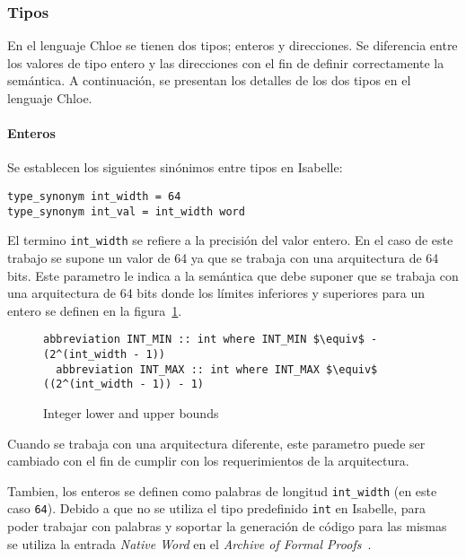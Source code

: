 \subsubsection*{Tipos}

En el lenguaje Chloe se tienen dos tipos; enteros y direcciones.
Se diferencia entre los valores de tipo entero y las direcciones con el fin de definir correctamente la semántica.
A continuación, se presentan los detalles de los dos tipos en el lenguaje Chloe.

\paragraph*{Enteros}

Se establecen los siguientes sinónimos entre tipos en Isabelle:

\begin{lstlisting}[frame=single]
type_synonym int_width = 64
type_synonym int_val = int_width word
\end{lstlisting}


El termino \verb|int_width| se refiere a la precisión del valor entero.
En el caso de este trabajo se supone un valor de 64 ya que se trabaja con una arquitectura de 64 bits.
Este parametro le indica a la semántica que debe suponer que se trabaja con una arquitectura de 64 bits donde los límites inferiores y superiores para un entero se definen en la figura~\ref{fig:int_bounds}.

\begin{figure}
  \begin{lstlisting}[frame=single, mathescape=true]
  abbreviation INT_MIN :: int where INT_MIN $\equiv$ - (2^(int_width - 1))
  abbreviation INT_MAX :: int where INT_MAX $\equiv$  ((2^(int_width - 1)) - 1)
  \end{lstlisting}

  \caption{Integer lower and upper bounds}
  \label{fig:int_bounds}
\end{figure}

Cuando se trabaja con una arquitectura diferente, este parametro puede ser cambiado con el fin de cumplir con los requerimientos de la arquitectura.

Tambien, los enteros se definen como palabras de longitud \verb|int_width| (en este caso \verb|64|).
Debido a que no se utiliza el tipo predefinido \verb|int| en Isabelle, para poder trabajar con palabras y soportar la generación de código para las mismas se utiliza la entrada \textit{Native Word} en el \textit{Archive of Formal Proofs}~\cite{Native_Word-AFP}.

